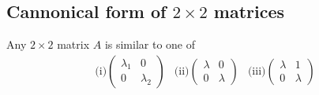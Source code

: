 \documentclass{article}
\numberwithin{equation}{section}
\begin{document}
\subsection{Cannonical form of $2 \times 2$ matrices}
Any $2 \times 2$ matrix $A$ is similar to one of
\begin{equation}\label{eq:5-19}
    \begin{array}{ccc}
        \text{(i)} \begin{pmatrix}
        \lambda_1 & 0 \\
        0 & \lambda_2
        \end{pmatrix}
        &
        \text{(ii)} \begin{pmatrix}
        \lambda & 0 \\
        0 & \lambda
        \end{pmatrix}
        &
        \text{(iii)} \begin{pmatrix}
        \lambda & 1 \\
        0 & \lambda
        \end{pmatrix}
    \end{array}
\end{equation}
\end{document}
